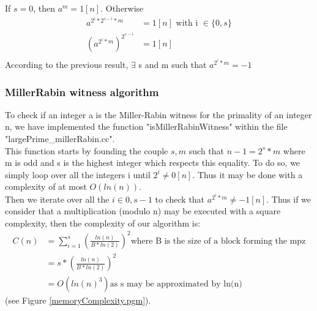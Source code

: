 \documentclass[12pt]{article} %
\begin{document}
If $s = 0$, then $a^{m} = 1[n]$.  Otherwise
\begin{equation}
\begin{aligned}
	a ^ {2^{i}*2^{s-i} *m } &= 1 [n] \mbox{ with i } \in \{0, s\}\\
	(a ^ {2^{i} *m}) ^ {2^{s-i}} &= 1 [n]\\
\end{aligned}
\end{equation}
According to the previous result, $\exists$ s and m such that $a ^ {2^{i} *m} = -1$







\subsubsection{Miller\-Rabin witness algorithm}
To check if an integer a is the Miller-Rabin witness for the primality of an integer n, we have implemented the function "isMillerRabinWitness" within the file "largePrime\_millerRabin.cc".\\

This function starts by founding the couple $s, m$ such that $n-1 = 2^{s} * m$ where m is odd and s is the highest integer which respects this equality.   To do so, we simply loop over all the integers i until $2^{i} \neq 0 [n]$.   Thus it may be done with a complexity of at most $O(ln(n))$.\\

Then we iterate over all the $i \in {0, s-1}$ to check that $a^{2^{i} * m} \neq -1 [n]$.   Thus if we consider that a multiplication (modulo n) may be executed with a square complexity, then the complexity of our algorithm is:
\begin{equation}
\begin{aligned}
	C(n)	&= \sum_{i=1}^{s}{(\frac{ln(n)}{B * ln(2)})^{2}} \mbox{where B is the size of a block forming the mpz} \\
			&= s * (\frac{ln(n)}{B * ln(2)})^{2}\\
            &= O(ln(n) ^ {3}) \mbox{as s may be approximated by ln(n)}
\end{aligned}
\end{equation}
(see Figure \ref{memoryComplexity.pgm}).\\
\end{document}
